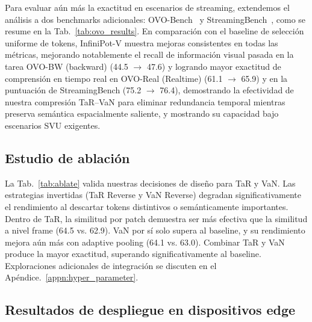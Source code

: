 Para evaluar aún más la exactitud en escenarios de streaming, extendemos el análisis a dos benchmarks adicionales: OVO-Bench~\cite{li2025ovobenchfarvideollmsrealworld} y StreamingBench~\cite{lin2024streaming}, como se resume en la Tab.~\ref{tab:ovo_results}. 
En comparación con el baseline de selección uniforme de tokens, InfiniPot-V muestra mejoras consistentes en todas las métricas, mejorando notablemente el recall de información visual pasada en la tarea OVO-BW (backward) (44.5 $\rightarrow$ 47.6) y logrando mayor exactitud de comprensión en tiempo real en OVO-Real (Realtime) (61.1 $\rightarrow$ 65.9) y en la puntuación de StreamingBench (75.2 $\rightarrow$ 76.4), demostrando la efectividad de nuestra compresión TaR--VaN para eliminar redundancia temporal mientras preserva semántica espacialmente saliente, y mostrando su capacidad bajo escenarios SVU exigentes.

\subsection{Estudio de ablación}


La Tab.~\ref{tab:ablate} valida nuestras decisiones de diseño para TaR y VaN. Las estrategias invertidas (TaR Reverse y VaN Reverse) degradan significativamente el rendimiento al descartar tokens distintivos o semánticamente importantes. Dentro de TaR, la similitud por patch demuestra ser más efectiva que la similitud a nivel frame (64.5 vs. 62.9). VaN por sí solo supera al baseline, y su rendimiento mejora aún más con adaptive pooling (64.1 vs. 63.0). Combinar TaR y VaN produce la mayor exactitud, superando significativamente al baseline. Exploraciones adicionales de integración se discuten en el Apéndice.~\ref{appn:hyper_parameter}.



\subsection{Resultados de despliegue en dispositivos edge}
\label{sec:deployment}

